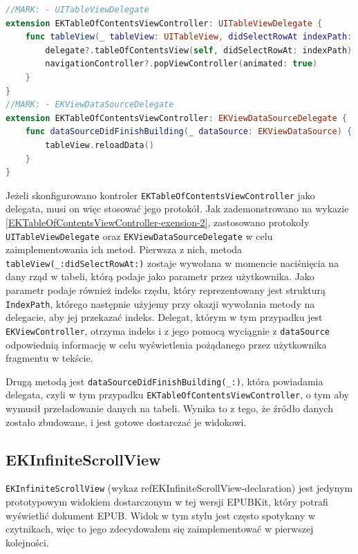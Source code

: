 \begin{lstlisting}[language=swift,caption={Rozszerzenie klasy \texttt{EKTableOfContentsViewController} o protokoły \texttt{UITableViewDelegate} oraz \texttt{EKViewDataSourceDelegate}},label=EKTableOfContentsViewController-exension-2]
//MARK: - UITableViewDelegate
extension EKTableOfContentsViewController: UITableViewDelegate {
    func tableView(_ tableView: UITableView, didSelectRowAt indexPath: IndexPath) {
        delegate?.tableOfContentsView(self, didSelectRowAt: indexPath)
        navigationController?.popViewController(animated: true)
    }
}
//MARK: - EKViewDataSourceDelegate
extension EKTableOfContentsViewController: EKViewDataSourceDelegate {
    func dataSourceDidFinishBuilding(_ dataSource: EKViewDataSource) {
        tableView.reloadData()
    }
}
\end{lstlisting}

Jeżeli skonfigurowano kontroler \texttt{EKTableOfContentsViewController} jako delegata, musi on więc stosować jego protokół. Jak zademonstrowano na wykazie \ref{EKTableOfContentsViewController-exension-2}, zastosowano protokoły \texttt{UITableViewDelegate} oraz \texttt{EKViewDataSourceDelegate} w celu zaimplementowania ich metod. Pierwsza z nich, metoda \texttt{tableView(\_:didSelectRowAt:)} zostaje wywołana w momencie naciśnięcia na dany rząd w tabeli, którą podaje jako parametr przez użytkownika. Jako parametr podaje również indeks rzędu, który reprezentowany jest strukturą \texttt{IndexPath}, którego następnie użyjemy przy okazji wywołania metody na delegacie, aby jej przekazać indeks. Delegat, którym w tym przypadku jest \texttt{EKViewController}, otrzyma indeks i z jego pomocą wyciągnie z \texttt{dataSource} odpowiednią informację w celu wyświetlenia pożądanego przez użytkownika fragmentu w tekście.

Drugą metodą jest \texttt{dataSourceDidFinishBuilding(\_:)}, która powiadamia delegata, czyli w tym przypadku \texttt{EKTableOfContentsViewController}, o tym aby wymusił przeładowanie danych na tabeli. Wynika to z tego, że źródło danych zostało zbudowane, i jest gotowe dostarczać je widokowi.

\subsection{EKInfiniteScrollView}

\texttt{EKInfiniteScrollView} (wykaz ref{EKInfiniteScrollView-declaration}) jest jedynym prototypowym widokiem dostarczonym w tej wersji EPUBKit, który potrafi wyświetlić dokument EPUB. Widok w tym stylu jest często spotykany w czytnikach, więc to jego zdecydowałem się zaimplementować w pierwszej kolejności.

